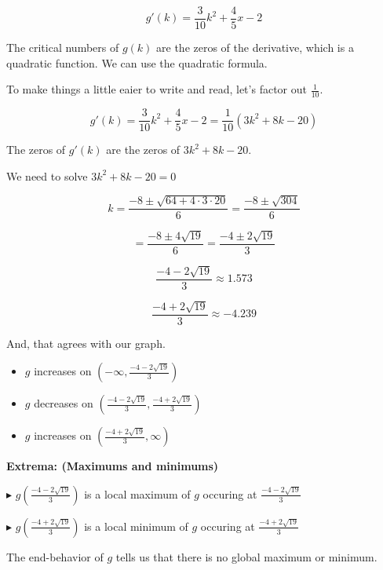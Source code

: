 \documentclass{ximera}
\begin{document}
\begin{example}
\[  g'(k) = \frac{3}{10} k^2 + \frac{4}{5} x - 2  \]



The critical numbers of $g(k)$ are the zeros of the derivative, which is a quadratic function. We can use the quadratic formula.




To make things a little eaier to write and read, let's factor out $\frac{1}{10}$.


\[    g'(k) = \frac{3}{10} k^2 + \frac{4}{5} x - 2  =  \frac{1}{10} ( 3 k^2 + 8 k - 20 )   \]


The zeros of $g'(k)$ are the zeros of $3 k^2 + 8 k - 20$.

We need to solve $3 k^2 + 8 k - 20 = 0$


\[  k = \frac{-8 \pm \sqrt{64 + 4 \cdot 3 \cdot 20}}{6}  = \frac{-8 \pm \sqrt{304}}{6} \]


\[   = \frac{-8 \pm 4 \sqrt{19}}{6}   = \frac{-4 \pm 2 \sqrt{19}}{3}      \]



\[   \frac{-4 - 2 \sqrt{19}}{3}  \approx   1.573    \]


\[   \frac{-4 + 2 \sqrt{19}}{3}  \approx   -4.239   \]


And, that agrees with our graph.




\begin{itemize}
\item  $g$ increases on $\left( -\infty, \frac{-4 - 2 \sqrt{19}}{3} \right)$ 
\item  $g$ decreases on $\left( \frac{-4 - 2 \sqrt{19}}{3}, \frac{-4 + 2 \sqrt{19}}{3}  \right)$ 
\item  $g$ increases on $\left( \frac{-4 + 2 \sqrt{19}}{3}, \infty \right)$ 
\end{itemize}




\textbf{Extrema: (Maximums and minimums) }


$\blacktriangleright$ $g\left( \frac{-4 - 2 \sqrt{19}}{3} \right)$ is a local maximum of $g$ occuring at $\frac{-4 - 2 \sqrt{19}}{3}$

$\blacktriangleright$ $g\left( \frac{-4 + 2 \sqrt{19}}{3} \right)$ is a local minimum of $g$ occuring at $\frac{-4 + 2 \sqrt{19}}{3}$





The end-behavior of $g$ tells us that there is no global maximum or minimum.



\end{example}
\end{document}

